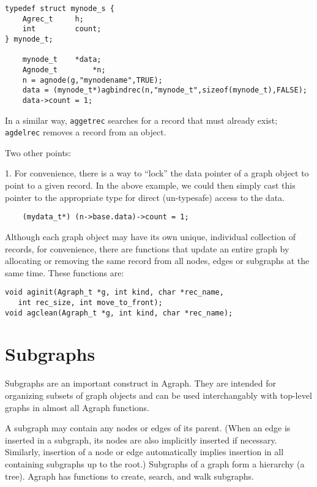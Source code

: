 \documentclass[11pt,letterpaper]{article}
\begin{document}
\begin{verbatim}
typedef struct mynode_s {
    Agrec_t     h;
    int         count;
} mynode_t;

    mynode_t    *data;
    Agnode_t        *n;
    n = agnode(g,"mynodename",TRUE);
    data = (mynode_t*)agbindrec(n,"mynode_t",sizeof(mynode_t),FALSE);
    data->count = 1;
\end{verbatim}

In a similar way, \verb"aggetrec" searches for a record that must already
exist; \verb"agdelrec" removes a record from an object. 

Two other points:

1. For convenience, there is a way to ``lock'' the data pointer of
a graph object to point to a given record.  In the above example,
we could then simply cast this pointer to the appropriate type
for direct (un-typesafe) access to the data.

\begin{verbatim}
    (mydata_t*) (n->base.data)->count = 1;
\end{verbatim}

Although each graph object may have its own unique, individual collection
of records, for convenience, there are functions that update an entire graph
by allocating or removing the same record from all nodes,
edges or subgraphs at the same time.  These functions are:

\begin{verbatim}
void aginit(Agraph_t *g, int kind, char *rec_name,
   int rec_size, int move_to_front);
void agclean(Agraph_t *g, int kind, char *rec_name);
\end{verbatim}

\section{Subgraphs}
\label{sec:subgraphs}
Subgraphs are an important construct in Agraph.  They are intended for
organizing subsets of graph objects and can be used interchangably with
top-level graphs in almost all Agraph functions.

A subgraph may contain any nodes or edges of its parent.
(When an edge is inserted in a subgraph, its nodes
are also implicitly inserted if necessary.  Similarly,
insertion of a node or edge automatically implies
insertion in all containing subgraphs up to the root.)
Subgraphs of a graph form a hierarchy (a tree).
Agraph has functions to create, search, and walk subgraphs.
\end{document}

